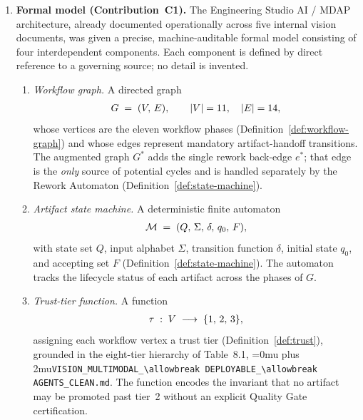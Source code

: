\documentclass[12pt]{article}
\theoremstyle{definition}
\DeclareRobustCommand{\code}[1]{\begingroup\Urlmuskip=0mu plus 2mu\relax\nolinkurl{#1}\endgroup}
\newcommand{\VisionClean}{\code{VISION\_MULTIMODAL\_\allowbreak DEPLOYABLE\_\allowbreak AGENTS\_CLEAN.md}}
\begin{document}
\begin{enumerate}

    \item \textbf{Formal model (Contribution~C1).}
          The Engineering Studio AI / MDAP architecture, already
          documented operationally across five internal vision documents,
          was given a precise, machine-auditable formal model consisting
          of four interdependent components.  Each component is defined
          by direct reference to a governing source; no detail is
          invented.

          \begin{enumerate}
              \item[C1a.] \emph{Workflow graph.}
                    A directed graph
                    \begin{align}
                        G \;=\; (V,\, E),
                        \qquad
                        |V| = 11,\quad |E| = 14,
                        \notag
                    \end{align}
                    whose vertices are the eleven workflow phases
                    (Definition~\ref{def:workflow-graph}) and whose edges
                    represent mandatory artifact-handoff transitions.
                    The augmented graph $G^{*}$ adds the single rework
                    back-edge $e^{*}$; that edge is the \emph{only}
                    source of potential cycles and is handled
                    separately by the Rework Automaton
                    (Definition~\ref{def:state-machine}).

              \item[C1b.] \emph{Artifact state machine.}
                    A deterministic finite automaton
                    \begin{align}
                        \mathcal{M}
                        \;=\;
                        (Q,\,\Sigma,\,\delta,\,q_0,\,F),
                        \notag
                    \end{align}
                    with state set $Q$, input alphabet $\Sigma$,
                    transition function $\delta$, initial state $q_0$,
                    and accepting set $F$ (Definition~\ref{def:state-machine}).
                    The automaton tracks the lifecycle status of each
                    artifact across the phases of $G$.

              \item[C1c.] \emph{Trust-tier function.}
                    A function
                    \begin{align}
                        \tau \;:\; V \;\longrightarrow\;
                        \{1,\,2,\,3\},
                        \notag
                    \end{align}
                    assigning each workflow vertex a trust tier
                    (Definition~\ref{def:trust}), grounded in the
                    eight-tier hierarchy of Table~8.1, \VisionClean{}.
                    The function encodes the invariant that no artifact
                    may be promoted past tier~2 without an explicit
                    Quality Gate certification.


\end{enumerate}
\end{enumerate}
\end{document}

